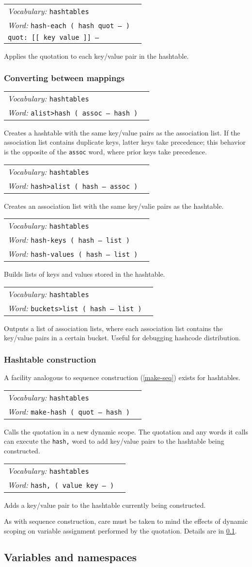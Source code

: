 \documentclass{book}
\newcommand{\vocabulary}[1]{\emph{Vocabulary:} \texttt{#1}&\\}
\newcommand{\ordinaryword}[2]{\index{\texttt{#1}}\emph{Word:} \texttt{#2}&\\}
\newcommand{\wordtable}[1]{


\begin{tabularx}{12cm}{lX}
\hline
#1
\hline
\end{tabularx}

}
\begin{document}
\wordtable{
\vocabulary{hashtables}
\ordinaryword{hash-each}{hash-each ( hash quot -- )}
\texttt{quot:~[[ key value ]] --}\\
}
Applies the quotation to each key/value pair in the hashtable.

\subsubsection{Converting between mappings}

\wordtable{
\vocabulary{hashtables}
\ordinaryword{alist>hash}{alist>hash ( assoc -- hash )}
}
Creates a hashtable with the same key/value pairs as the association list. If the association list contains duplicate keys, latter keys take precedence; this behavior is the opposite of the \texttt{assoc} word, where prior keys take precedence.
\wordtable{
\vocabulary{hashtables}
\ordinaryword{hash>alist}{hash>alist ( hash -- assoc )}
}
Creates an association list with the same key/valie pairs as the hashtable.
\wordtable{
\vocabulary{hashtables}
\ordinaryword{hash-keys}{hash-keys ( hash -- list )}
\ordinaryword{hash-values}{hash-values ( hash -- list )}
}
Builds lists of keys and values stored in the hashtable.
\wordtable{
\vocabulary{hashtables}
\ordinaryword{buckets>list}{buckets>list ( hash -- list )}
}
Outputs a list of association lists, where each association list contains the key/value pairs in a certain bucket. Useful for debugging hashcode distribution.

\subsubsection{Hashtable construction}

A facility analogous to sequence construction (\ref{make-seq}) exists for hashtables.

\wordtable{
\vocabulary{hashtables}
\ordinaryword{make-hash}{make-hash ( quot -- hash )}
}
Calls the quotation in a new dynamic scope. The quotation and any words it calls can execute the \texttt{hash,} word to add key/value pairs to the hashtable being constructed.
\wordtable{
\vocabulary{hashtables}
\ordinaryword{hash,}{hash,~( value key -- )}
}
Adds a key/value pair to the hashtable currently being constructed.

As with sequence construction, care must be taken to mind the effects of dynamic scoping on variable assignment performed by the quotation. Details are in \ref{namespaces}.

\subsection{Variables and namespaces}\label{namespaces}
\end{document}
